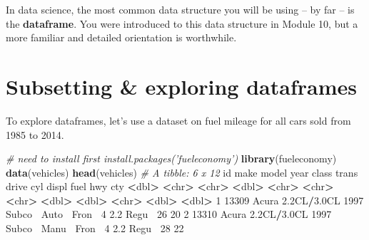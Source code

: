 \documentclass[
]{book}
\newenvironment{Shaded}{\begin{snugshade}}{\end{snugshade}}
\newcommand{\CommentTok}[1]{\textcolor[rgb]{0.56,0.35,0.01}{\textit{#1}}}
\newcommand{\DecValTok}[1]{\textcolor[rgb]{0.00,0.00,0.81}{#1}}
\newcommand{\ErrorTok}[1]{\textcolor[rgb]{0.64,0.00,0.00}{\textbf{#1}}}
\newcommand{\FloatTok}[1]{\textcolor[rgb]{0.00,0.00,0.81}{#1}}
\newcommand{\KeywordTok}[1]{\textcolor[rgb]{0.13,0.29,0.53}{\textbf{#1}}}
\newcommand{\NormalTok}[1]{#1}
\newcommand{\OperatorTok}[1]{\textcolor[rgb]{0.81,0.36,0.00}{\textbf{#1}}}
\newcommand{\StringTok}[1]{\textcolor[rgb]{0.31,0.60,0.02}{#1}}
\begin{document}
In data science, the most common data structure you will be using -- by far -- is the \textbf{dataframe}. You were introduced to this data structure in Module 10, but a more familiar and detailed orientation is worthwhile.

\hypertarget{subsetting-exploring-dataframes}{%
\section*{Subsetting \& exploring dataframes}\label{subsetting-exploring-dataframes}}

To explore dataframes, let's use a dataset on fuel mileage for all cars sold from 1985 to 2014.

\begin{Shaded}
\begin{Highlighting}[]
\CommentTok{# need to install first install.packages('fueleconomy')}
\KeywordTok{library}\NormalTok{(fueleconomy)}
\KeywordTok{data}\NormalTok{(vehicles)}
\KeywordTok{head}\NormalTok{(vehicles)}
\CommentTok{# A tibble: 6 x 12}
\NormalTok{     id make  model        year class  trans drive   cyl displ fuel    hwy   cty}
  \OperatorTok{<}\NormalTok{dbl}\OperatorTok{>}\StringTok{ }\ErrorTok{<}\NormalTok{chr}\OperatorTok{>}\StringTok{ }\ErrorTok{<}\NormalTok{chr}\OperatorTok{>}\StringTok{       }\ErrorTok{<}\NormalTok{dbl}\OperatorTok{>}\StringTok{ }\ErrorTok{<}\NormalTok{chr}\OperatorTok{>}\StringTok{  }\ErrorTok{<}\NormalTok{chr}\OperatorTok{>}\StringTok{ }\ErrorTok{<}\NormalTok{chr}\OperatorTok{>}\StringTok{ }\ErrorTok{<}\NormalTok{dbl}\OperatorTok{>}\StringTok{ }\ErrorTok{<}\NormalTok{dbl}\OperatorTok{>}\StringTok{ }\ErrorTok{<}\NormalTok{chr}\OperatorTok{>}\StringTok{ }\ErrorTok{<}\NormalTok{dbl}\OperatorTok{>}\StringTok{ }\ErrorTok{<}\NormalTok{dbl}\OperatorTok{>}
\DecValTok{1} \DecValTok{13309}\NormalTok{ Acura }\FloatTok{2.2}\NormalTok{CL}\OperatorTok{/}\FloatTok{3.0}\NormalTok{CL  }\DecValTok{1997}\NormalTok{ Subco}\OperatorTok{~}\StringTok{ }\NormalTok{Auto}\OperatorTok{~}\StringTok{ }\NormalTok{Fron}\OperatorTok{~}\StringTok{     }\DecValTok{4}   \FloatTok{2.2}\NormalTok{ Regu}\OperatorTok{~}\StringTok{    }\DecValTok{26}    \DecValTok{20}
\DecValTok{2} \DecValTok{13310}\NormalTok{ Acura }\FloatTok{2.2}\NormalTok{CL}\OperatorTok{/}\FloatTok{3.0}\NormalTok{CL  }\DecValTok{1997}\NormalTok{ Subco}\OperatorTok{~}\StringTok{ }\NormalTok{Manu}\OperatorTok{~}\StringTok{ }\NormalTok{Fron}\OperatorTok{~}\StringTok{     }\DecValTok{4}   \FloatTok{2.2}\NormalTok{ Regu}\OperatorTok{~}\StringTok{    }\DecValTok{28}    \DecValTok{22}

\end{Highlighting}
\end{Shaded}
\end{document}
